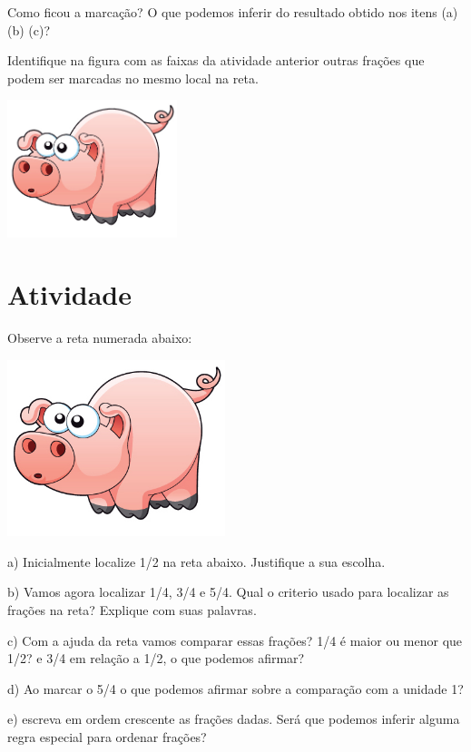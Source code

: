 \documentclass[a4,12pt]{book}
\newcounter{atividade}
\begin{document}
Como ficou a marcação? O que podemos inferir do resultado obtido nos itens (a) (b) (c)?

Identifique na figura com as faixas da atividade anterior outras frações que podem ser marcadas no mesmo local na reta.






\includegraphics[width=\textwidth,height=4cm, keepaspectratio]{pig}
\section{Atividade}



Observe a reta numerada abaixo:

\includegraphics[width=180pt, keepaspectratio]{pig}

a) Inicialmente localize 1/2 na reta abaixo. Justifique a sua escolha.

b) Vamos agora localizar 1/4, 3/4 e 5/4. Qual o criterio usado para localizar as frações na reta? Explique com suas palavras.

c) Com a ajuda da reta vamos comparar essas frações? 1/4 é maior ou menor que 1/2?  e 3/4 em relação a 1/2, o que podemos afirmar?

d) Ao marcar o 5/4 o que podemos afirmar sobre a comparação com a unidade 1?

e) escreva em ordem crescente as frações dadas. Será que podemos inferir alguma regra especial para ordenar frações?
\end{document}
